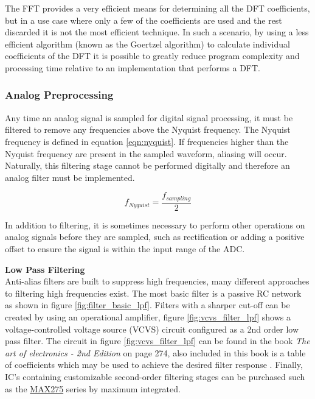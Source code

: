 The FFT provides a very efficient means for determining all the DFT coefficients, but in a use case where only a few of the coefficients are used and the rest discarded it is not the most efficient technique. In such a scenario, by using a less efficient algorithm (known as the Goertzel algorithm) to calculate individual coefficients of the DFT it is possible to greatly reduce program complexity and processing time relative to an implementation that performs a DFT.


\subsubsection{Analog Preprocessing}

Any time an analog signal is sampled for digital signal processing, it must be filtered to remove any frequencies above the Nyquist frequency. The Nyquist frequency is defined in equation \ref{eqn:nyquist}. If frequencies higher than the Nyquist frequency are present in the sampled waveform, aliasing will occur. Naturally, this filtering stage cannot be performed digitally and therefore an analog filter must be implemented.

\begin{equation}
	f_{Nyquist} = \frac{f_{sampling}}{2}
	\label{eqn:nyquist}
\end{equation}


In addition to filtering, it is sometimes necessary to perform other operations on analog signals before they are sampled, such as rectification or adding a positive offset to ensure the signal is within the input range of the ADC.

\textbf{Low Pass Filtering}\\
Anti-alias filters are built to suppress high frequencies, many different approaches to filtering high frequencies exist. The most basic filter is a passive RC network as shown in figure \ref{fig:filter_basic_lpf}. Filters with a sharper cut-off can be created by using an operational amplifier, figure \ref{fig:vcvs_filter_lpf} shows a voltage-controlled voltage source (VCVS) circuit configured as a 2nd order low pass filter. The circuit in figure \ref{fig:vcvs_filter_lpf} can be found in the book \textit{The art of electronics - 2nd Edition} on page 274, also included in this book is a table of coefficients which may be used to achieve the desired filter response \cite{Horowitz1995}. Finally, IC's containing customizable second-order filtering stages can be purchased such as the \href{https://www.maximintegrated.com/en/products/analog/analog-filters/MAX275.html/tb_tab0}{MAX275} series by maximum integrated.

